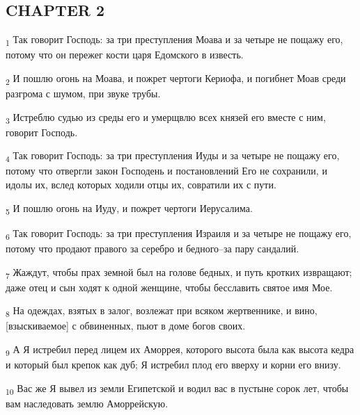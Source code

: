 \subsection{CHAPTER 2}
\begin{tcolorbox}
\textsubscript{1} Так говорит Господь: за три преступления Моава и за четыре не пощажу его, потому что он пережег кости царя Едомского в известь.
\end{tcolorbox}
\begin{tcolorbox}
\textsubscript{2} И пошлю огонь на Моава, и пожрет чертоги Кериофа, и погибнет Моав среди разгрома с шумом, при звуке трубы.
\end{tcolorbox}
\begin{tcolorbox}
\textsubscript{3} Истреблю судью из среды его и умерщвлю всех князей его вместе с ним, говорит Господь.
\end{tcolorbox}
\begin{tcolorbox}
\textsubscript{4} Так говорит Господь: за три преступления Иуды и за четыре не пощажу его, потому что отвергли закон Господень и постановлений Его не сохранили, и идолы их, вслед которых ходили отцы их, совратили их с пути.
\end{tcolorbox}
\begin{tcolorbox}
\textsubscript{5} И пошлю огонь на Иуду, и пожрет чертоги Иерусалима.
\end{tcolorbox}
\begin{tcolorbox}
\textsubscript{6} Так говорит Господь: за три преступления Израиля и за четыре не пощажу его, потому что продают правого за серебро и бедного--за пару сандалий.
\end{tcolorbox}
\begin{tcolorbox}
\textsubscript{7} Жаждут, чтобы прах земной был на голове бедных, и путь кротких извращают; даже отец и сын ходят к одной женщине, чтобы бесславить святое имя Мое.
\end{tcolorbox}
\begin{tcolorbox}
\textsubscript{8} На одеждах, взятых в залог, возлежат при всяком жертвеннике, и вино, [взыскиваемое] с обвиненных, пьют в доме богов своих.
\end{tcolorbox}
\begin{tcolorbox}
\textsubscript{9} А Я истребил перед лицем их Аморрея, которого высота была как высота кедра и который был крепок как дуб; Я истребил плод его вверху и корни его внизу.
\end{tcolorbox}
\begin{tcolorbox}
\textsubscript{10} Вас же Я вывел из земли Египетской и водил вас в пустыне сорок лет, чтобы вам наследовать землю Аморрейскую.
\end{tcolorbox}
